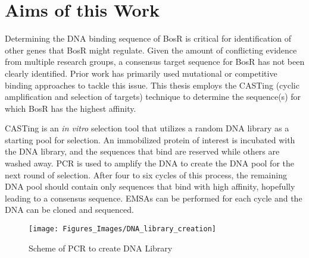 \documentclass[12pt,twoside]{reedthesis}
\begin{document}
	
	
	
	
		 
		  
\section{Aims of this Work}

Determining the DNA binding sequence of BosR is critical for identification of other genes that BosR might regulate. 	 Given the amount of conflicting evidence from multiple research groups, a consensus target sequence for BosR has not been clearly identified. Prior work has primarily used mutational or competitive binding approaches to tackle this issue. This thesis employs the CASTing (cyclic amplification and selection of targets) technique to determine the sequence(s) for which BosR has the highest affinity. 


CASTing is an \textit{in vitro} selection tool that utilizes a random DNA library as a starting pool for selection. An immobilized protein of interest is incubated with the DNA library, and the sequences that bind are reserved while others are washed away. PCR is used to amplify the DNA to create the DNA pool for the next round of selection. After four to six cycles of this process, the remaining DNA pool should contain only sequences that bind with high affinity, hopefully leading to a consensus sequence. EMSAs can be performed for each cycle and the DNA  can be cloned and sequenced. 
		 	 	\begin{figure}[h]
		 	 		
		 	 		\centering
		 	 		\texttt{[image: Figures\_Images/DNA\_library\_creation]}
		 	 		\caption[DNA Library Creation]{Scheme of PCR to create DNA Library}
		 	 		\label{DNALibrary}
		 	 	\end{figure}
		 	 	
\end{document}
